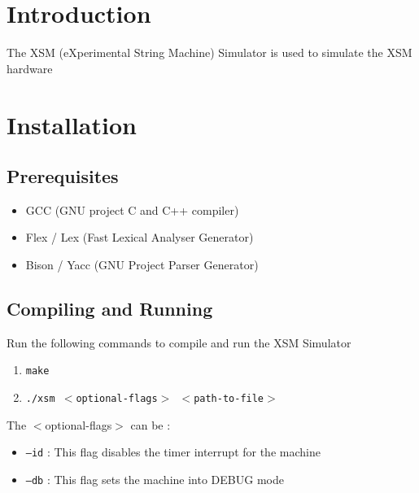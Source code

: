\documentclass[11pt]{report}
\begin{document}
\section{Introduction}
The XSM (eXperimental String Machine)  Simulator is used to simulate the XSM hardware

\section{Installation}

\subsection{Prerequisites}
\begin{itemize}
	\item GCC  (GNU project C and C++ compiler)
	\item Flex / Lex  (Fast Lexical Analyser Generator)
	\item Bison / Yacc  (GNU Project Parser Generator)
\end{itemize} 


\subsection{Compiling and Running}
Run the following commands to compile and run the XSM Simulator
\begin{enumerate}
		\item \texttt{make}
		\item \texttt{./xsm $<$optional-flags$>$ $<$path-to-file$>$ }
\end{enumerate}
The $<$optional-flags$>$ can be :
\begin{itemize}
	\item \texttt{--id}  : This flag disables the timer interrupt for the machine
	\item \texttt{--db}  : This flag sets the machine into DEBUG mode
\end{itemize}
\end{document}
